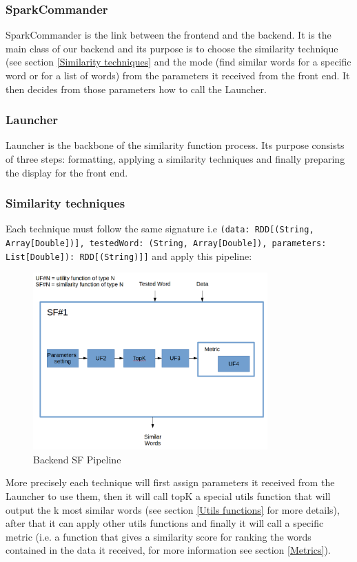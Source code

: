 \documentclass{article}
\begin{document}
\subsubsection{SparkCommander}
SparkCommander is the link between the frontend and the backend. It is the main class of our backend and its purpose is to choose the similarity technique (see section \ref{Similarity techniques} and the mode (find similar words for a specific word or for a list of words) from the parameters it received from the front end. It then decides from those parameters how to call the Launcher.

\subsubsection{Launcher}
Launcher is the backbone of the similarity function process. Its purpose consists of three steps: formatting, applying a similarity techniques and finally preparing the display for the front end.

\subsubsection{Similarity techniques}
Each technique must follow the same signature i.e \texttt{(data: RDD[(String, Array[Double])], testedWord: (String, Array[Double]), parameters: List[Double]): RDD[(String)]]} 
 and apply this pipeline:\\

\begin{figure}[ht!]
\centering
\includegraphics[width=90mm]{reportBackendSFPipeline.png}
\caption{Backend SF Pipeline \label{overflow}}
\end{figure}



More precisely each technique will first assign parameters it received from the Launcher to use them, then it will call topK a special utils function that will output the k most similar words (see section \ref{Utils functions} for more details), after that it can apply other utils functions and finally it will call a specific metric (i.e. a function that gives a similarity score for ranking the words contained in the data it received, for more information see section \ref{Metrics}).
\end{document}

